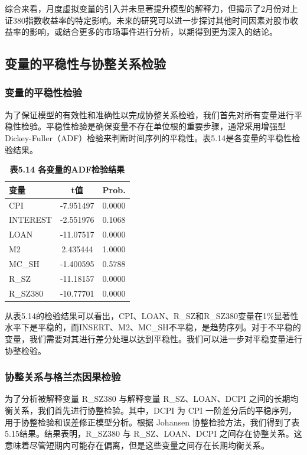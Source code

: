 \documentclass[12pt, a4paper]{article}
\numberwithin{equation}{section}
\begin{document}
综合来看，月度虚拟变量的引入并未显著提升模型的解释力，但揭示了2月份对上证380指数收益率的特定影响。未来的研究可以进一步探讨其他时间因素对股市收益率的影响，或结合更多的市场事件进行分析，以期得到更为深入的结论。

\subsection{变量的平稳性与协整关系检验}
\subsubsection{变量的平稳性检验}
为了保证模型的有效性和准确性以完成协整关系检验，我们首先对所有变量进行平稳性检验。平稳性检验是确保变量不存在单位根的重要步骤，通常采用增强型Dickey-Fuller（ADF）检验来判断时间序列的平稳性。表5.14是各变量的平稳性检验结果。

\begin{table}[h!]
    \centering
    \captionsetup{labelformat=empty}
    \caption{\textbf{\fontsize{9pt}{11pt}\selectfont 表5.14 各变量的ADF检验结果}}
    \begin{tabular}{lcc}
        \toprule
        变量       & t值        & Prob.  \\
        \midrule
        CPI      & -7.951497 & 0.0000 \\
        INTEREST & -2.551976 & 0.1068 \\
        LOAN     & -11.07517 & 0.0000 \\
        M2       & 2.435444  & 1.0000 \\
        MC\_SH   & -1.400595 & 0.5788 \\
        R\_SZ    & -11.18157 & 0.0000 \\
        R\_SZ380 & -10.77701 & 0.0000 \\
        \bottomrule
    \end{tabular}
\end{table}

从表5.14的检验结果可以看出，CPI、LOAN、R\_SZ和R\_SZ380变量在1\%显著性水平下是平稳的，而INSERT、M2、MC\_SH不平稳，是趋势序列。对于不平稳的变量，我们需要对其进行差分处理以达到平稳性。我们可以进一步对平稳变量进行协整检验。

\subsubsection{协整关系与格兰杰因果检验}

为了分析被解释变量 R\_SZ380 与解释变量 R\_SZ、LOAN、DCPI 之间的长期均衡关系，我们首先进行协整检验。其中，DCPI 为 CPI 一阶差分后的平稳序列，用于协整检验和误差修正模型分析。根据 Johansen 协整检验方法，我们得到了表5.15结果。结果表明，R\_SZ380 与 R\_SZ、LOAN、DCPI 之间存在协整关系。这意味着尽管短期内可能存在偏离，但是这些变量之间存在长期均衡关系。
\end{document}
